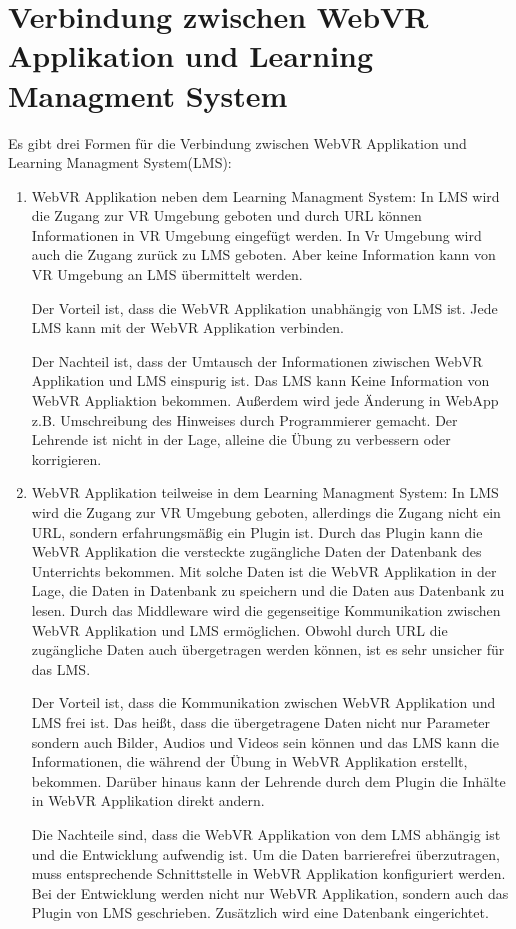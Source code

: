 \section{Verbindung zwischen WebVR Applikation und Learning Managment System}
Es gibt drei Formen für die Verbindung zwischen WebVR Applikation und Learning Managment System(LMS):
\begin{enumerate}
    \item WebVR Applikation neben dem Learning Managment System:
     \subitem In LMS wird die Zugang zur VR Umgebung geboten und durch URL können Informationen in VR Umgebung eingefügt werden. In Vr Umgebung wird auch die Zugang zurück zu LMS geboten. Aber keine Information kann von VR Umgebung an LMS übermittelt werden.
     
     Der Vorteil ist, dass die WebVR Applikation unabhängig von LMS ist. Jede LMS kann mit der WebVR Applikation verbinden.
     
     Der Nachteil ist, dass der Umtausch der Informationen ziwischen WebVR Applikation und LMS einspurig ist. Das LMS kann Keine Information von WebVR Appliaktion bekommen. Außerdem wird jede Änderung in WebApp z.B. Umschreibung des Hinweises durch Programmierer gemacht. Der Lehrende ist nicht in der Lage, alleine die Übung zu verbessern oder korrigieren.
     
    \item WebVR Applikation teilweise in dem Learning Managment System:
     \subitem In LMS wird die Zugang zur VR Umgebung geboten, allerdings die Zugang nicht ein URL, sondern erfahrungsmäßig ein Plugin ist. Durch das Plugin kann die WebVR Applikation die versteckte zugängliche Daten der Datenbank des Unterrichts bekommen. Mit solche Daten ist die WebVR Applikation in der Lage, die Daten in Datenbank zu speichern und die Daten aus Datenbank zu lesen. Durch das Middleware wird die gegenseitige Kommunikation zwischen WebVR Applikation und LMS ermöglichen. Obwohl durch URL die zugängliche Daten auch übergetragen werden können, ist es sehr unsicher für das LMS.
     
     Der Vorteil ist, dass die Kommunikation zwischen WebVR Applikation und LMS frei ist. Das heißt, dass die übergetragene Daten nicht nur Parameter sondern auch Bilder, Audios und Videos sein können und das LMS kann die Informationen, die während der Übung in WebVR Applikation erstellt, bekommen. Darüber hinaus kann der Lehrende durch dem Plugin die Inhälte in WebVR Applikation direkt andern.
     
     Die Nachteile sind, dass die WebVR Applikation von dem LMS abhängig ist und die Entwicklung aufwendig ist. Um die Daten barrierefrei überzutragen, muss entsprechende Schnittstelle in WebVR Applikation konfiguriert werden. Bei der Entwicklung werden nicht nur WebVR Applikation, sondern auch das Plugin von LMS geschrieben. Zusätzlich wird eine Datenbank eingerichtet.
     

\end{enumerate}
